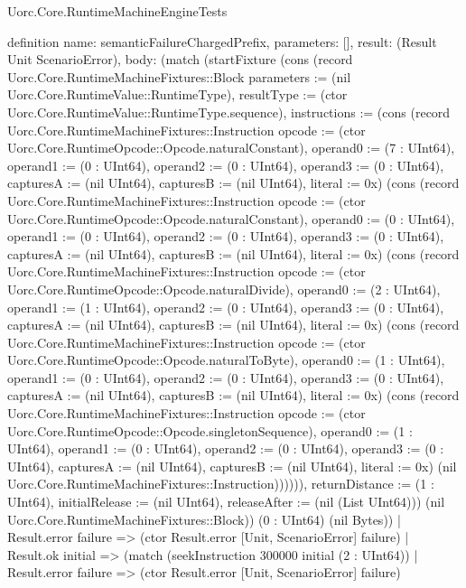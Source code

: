 \begin{lexlean}{Uorc.Core.RuntimeMachineEngineTests}
\begin{semanticmodule}
definition{
  name: semanticFailureChargedPrefix,
  parameters: [],
  result: (Result Unit ScenarioError),
  body: (match (startFixture (cons (record Uorc.Core.RuntimeMachineFixtures::Block {parameters := (nil Uorc.Core.RuntimeValue::RuntimeType), resultType := (ctor Uorc.Core.RuntimeValue::RuntimeType.sequence), instructions := (cons (record Uorc.Core.RuntimeMachineFixtures::Instruction {opcode := (ctor Uorc.Core.RuntimeOpcode::Opcode.naturalConstant), operand0 := (7 : UInt64), operand1 := (0 : UInt64), operand2 := (0 : UInt64), operand3 := (0 : UInt64), capturesA := (nil UInt64), capturesB := (nil UInt64), literal := 0x}) (cons (record Uorc.Core.RuntimeMachineFixtures::Instruction {opcode := (ctor Uorc.Core.RuntimeOpcode::Opcode.naturalConstant), operand0 := (0 : UInt64), operand1 := (0 : UInt64), operand2 := (0 : UInt64), operand3 := (0 : UInt64), capturesA := (nil UInt64), capturesB := (nil UInt64), literal := 0x}) (cons (record Uorc.Core.RuntimeMachineFixtures::Instruction {opcode := (ctor Uorc.Core.RuntimeOpcode::Opcode.naturalDivide), operand0 := (2 : UInt64), operand1 := (1 : UInt64), operand2 := (0 : UInt64), operand3 := (0 : UInt64), capturesA := (nil UInt64), capturesB := (nil UInt64), literal := 0x}) (cons (record Uorc.Core.RuntimeMachineFixtures::Instruction {opcode := (ctor Uorc.Core.RuntimeOpcode::Opcode.naturalToByte), operand0 := (1 : UInt64), operand1 := (0 : UInt64), operand2 := (0 : UInt64), operand3 := (0 : UInt64), capturesA := (nil UInt64), capturesB := (nil UInt64), literal := 0x}) (cons (record Uorc.Core.RuntimeMachineFixtures::Instruction {opcode := (ctor Uorc.Core.RuntimeOpcode::Opcode.singletonSequence), operand0 := (1 : UInt64), operand1 := (0 : UInt64), operand2 := (0 : UInt64), operand3 := (0 : UInt64), capturesA := (nil UInt64), capturesB := (nil UInt64), literal := 0x}) (nil Uorc.Core.RuntimeMachineFixtures::Instruction)))))), returnDistance := (1 : UInt64), initialRelease := (nil UInt64), releaseAfter := (nil (List UInt64))}) (nil Uorc.Core.RuntimeMachineFixtures::Block)) (0 : UInt64) (nil Bytes))
    | Result.error failure => (ctor Result.error [Unit, ScenarioError] failure)
    | Result.ok initial => (match (seekInstruction 300000 initial (2 : UInt64))
      | Result.error failure => (ctor Result.error [Unit, ScenarioError] failure)
}
\end{semanticmodule}
\end{lexlean}

